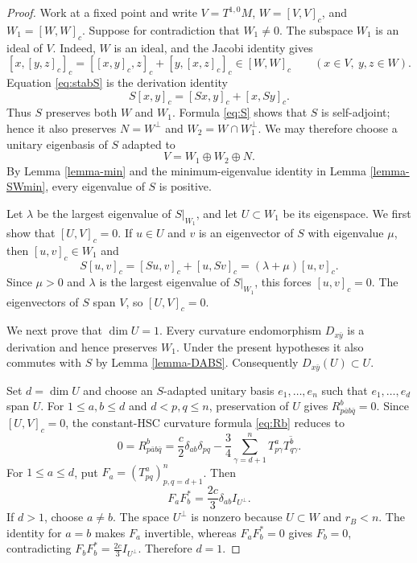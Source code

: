 \documentclass{amsart}
\begin{document}
\begin{proof}
Work at a fixed point and write $V=T^{1,0}M$, $W=[V,V]_c$, and
$W_1=[W,W]_c$. Suppose for contradiction that $W_1\ne0$.
The subspace $W_1$ is an ideal of $V$. Indeed, $W$ is an ideal, and the
Jacobi identity gives
\[
 [x,[y,z]_c]_c=[[x,y]_c,z]_c+[y,[x,z]_c]_c\in[W,W]_c
 \qquad (x\in V,\ y,z\in W).
\]
Equation \eqref{eq:stabS} is the derivation identity
\[
 S[x,y]_c=[Sx,y]_c+[x,Sy]_c.
\]
Thus $S$ preserves both $W$ and $W_1$. Formula \eqref{eq:S} shows that
$S$ is self-adjoint; hence it also preserves $N=W^\perp$ and
$W_2=W\cap W_1^\perp$. We may therefore choose a unitary eigenbasis
of $S$ adapted to
\[
 V=W_1\oplus W_2\oplus N.
\]
By Lemma \ref{lemma-min} and the minimum-eigenvalue identity in
Lemma \ref{lemma-SWmin}, every eigenvalue of $S$ is positive.

Let $\lambda$ be the largest eigenvalue of $S|_{W_1}$, and let
$U\subset W_1$ be its eigenspace. We first show that $[U,V]_c=0$. If
$u\in U$ and $v$ is an eigenvector of $S$ with eigenvalue $\mu$, then
$[u,v]_c\in W_1$ and
\[
 S[u,v]_c=[Su,v]_c+[u,Sv]_c=(\lambda+\mu)[u,v]_c.
\]
Since $\mu>0$ and $\lambda$ is the largest eigenvalue of $S|_{W_1}$,
this forces $[u,v]_c=0$. The eigenvectors of $S$ span $V$, so
$[U,V]_c=0$.

We next prove that $\dim U=1$.
Every curvature endomorphism $D_{x\bar y}$ is a derivation and hence
preserves $W_1$. Under the present hypotheses it also commutes with $S$
by Lemma \ref{lemma-DABS}. Consequently $D_{x\bar y}(U)\subset U$.

Set $d=\dim U$ and choose an $S$-adapted unitary basis
$e_1,\ldots,e_n$ such that $e_1,\ldots,e_d$ span $U$. For
$1\leq a,b\leq d$ and $d<p,q\leq n$, preservation of $U$ gives
$R^b_{p\bar a b\bar q}=0$. Since $[U,V]_c=0$,
 the constant-HSC curvature formula \eqref{eq:Rb} reduces to
\[
 0=R^b_{p\bar a b\bar q}
 =\frac{c}{2}\delta_{ab}\delta_{pq}
  -\frac{3}{4}\sum_{\gamma=d+1}^n
       T^a_{p\gamma}\overline{T^b_{q\gamma}}.
\]
For $1\leq a\leq d$, put
$F_a=(T^a_{pq})_{p,q=d+1}^n$. Then
\[
 F_aF_b^*=\frac{2c}{3}\delta_{ab}I_{U^\perp}.
\]
If $d>1$, choose $a\ne b$.
The space $U^\perp$ is nonzero because $U\subset W$ and $r_B<n$.
The identity for $a=b$ makes $F_a$ invertible, whereas
$F_aF_b^*=0$ gives $F_b=0$, contradicting
$F_bF_b^*=\frac{2c}{3}I_{U^\perp}$. Therefore $d=1$.


\end{proof}
\end{document}
